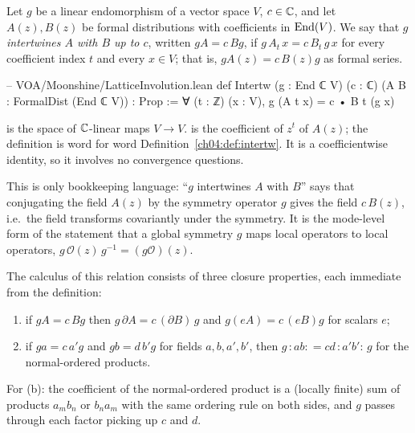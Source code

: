 \begin{definition}\label{ch04:def:intertw}
Let $g$ be a linear endomorphism of a vector space $V$, $c\in{\mathbb{C}}$, and let $A(z),B(z)$ be formal
distributions with coefficients in $\operatorname{End}(V)$. We say that \emph{$g$ intertwines $A$ with $B$ up
to $c$}, written $gA=c\,Bg$, if $g\,A_t\,x=c\,B_t\,g\,x$ for every coefficient index $t$ and every
$x\in V$; that is, $gA(z)=c\,B(z)g$ as formal series.
\end{definition}

\begin{leancode}
-- VOA/Moonshine/LatticeInvolution.lean
def Intertw (g : End ℂ V) (c : ℂ) (A B : FormalDist (End ℂ V)) : Prop :=
  ∀ (t : ℤ) (x : V), g (A t x) = c • B t (g x)
\end{leancode}

\begin{dictionary}
 is the space of ${\mathbb{C}}$-linear maps $V\to V$.  is the coefficient of $z^t$
of $A(z)$; the definition is word for word Definition~\ref{ch04:def:intertw}. It is a
coefficientwise identity, so it involves no convergence questions.
\end{dictionary}

\begin{physics}
This is only bookkeeping language: ``$g$ intertwines $A$ with $B$'' says that conjugating the field $A(z)$ by the symmetry operator $g$ gives the field $c\,B(z)$, i.e.\ the field transforms covariantly under the symmetry. It is the mode-level form of the statement that a global symmetry $g$ maps local operators to local operators, $g\,\mathcal O(z)\,g^{-1}=(g\mathcal O)(z)$.
\end{physics}

The calculus of this relation consists of three closure properties, each immediate from the
definition:
\begin{enumerate}[label=(\alph*)]
\item if $gA=c\,Bg$ then $g\,\partial A=c\,(\partial B)\,g$ and $g(eA)=c\,(eB)g$ for scalars $e$;
\item if $ga=c\,a'g$ and $gb=d\,b'g$ for fields $a,b,a',b'$, then
  $g\,{:}ab{:}=cd\,{:}a'b'{:}\,g$ for the normal-ordered products.
\end{enumerate}
For (b): the coefficient of the normal-ordered product is a (locally finite) sum of products
$a_mb_n$ or $b_na_m$ with the same ordering rule on both sides, and $g$ passes through each factor
picking up $c$ and $d$.

